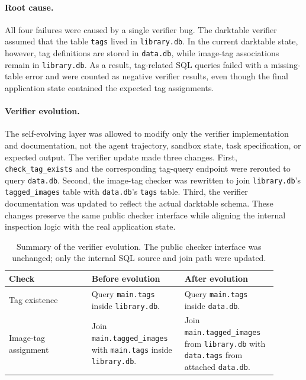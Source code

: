 \paragraph{Root cause.}
All four failures were caused by a single verifier bug. The darktable verifier
assumed that the table \texttt{tags} lived in \texttt{library.db}. In the current
darktable state, however, tag definitions are stored in \texttt{data.db}, while
image-tag associations remain in \texttt{library.db}. As a result, tag-related
SQL queries failed with a missing-table error and were counted as negative
verifier results, even though the final application state contained the expected
tag assignments.

\paragraph{Verifier evolution.}
The self-evolving layer was allowed to modify only the verifier implementation
and documentation, not the agent trajectory, sandbox state, task specification,
or expected output. The verifier update made three changes. First,
\texttt{check\_tag\_exists} and the corresponding tag-query endpoint were
rerouted to query \texttt{data.db}. Second, the image-tag checker was rewritten
to join \texttt{library.db}'s \texttt{tagged\_images} table with
\texttt{data.db}'s \texttt{tags} table. Third, the verifier documentation was
updated to reflect the actual darktable schema. These changes preserve the same
public checker interface while aligning the internal inspection logic with the
real application state.

\begin{table}[H]
\centering
\small
\caption{
Summary of the verifier evolution. The public checker interface was unchanged;
only the internal SQL source and join path were updated.
}
\begin{tabular}{p{0.28\linewidth}p{0.31\linewidth}p{0.31\linewidth}}
\toprule
Check & Before evolution & After evolution \\
\midrule
Tag existence &
Query \texttt{main.tags} inside \texttt{library.db}. &
Query \texttt{main.tags} inside \texttt{data.db}. \\
\addlinespace
Image-tag assignment &
Join \texttt{main.tagged\_images} with \texttt{main.tags} inside \texttt{library.db}. &
Join \texttt{main.tagged\_images} from \texttt{library.db} with \texttt{data.tags} from attached \texttt{data.db}. \\
\bottomrule
\end{tabular}
\label{tab:darktable-self-evolving-update}
\end{table}

